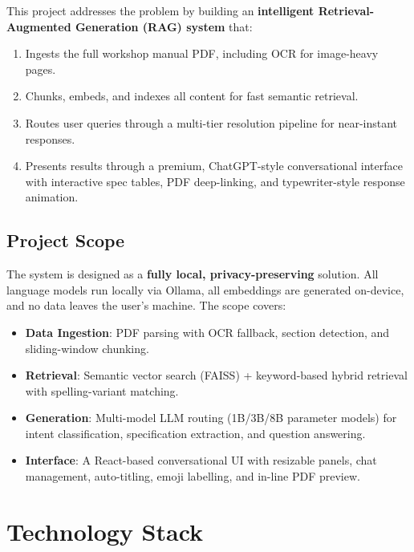 \documentclass[12pt, a4paper]{article}
\begin{document}
This project addresses the problem by building an \textbf{intelligent Retrieval-Augmented Generation (RAG) system} that:
\begin{enumerate}[itemsep=2pt]
  \item Ingests the full workshop manual PDF, including OCR for image-heavy pages.
  \item Chunks, embeds, and indexes all content for fast semantic retrieval.
  \item Routes user queries through a multi-tier resolution pipeline for near-instant responses.
  \item Presents results through a premium, ChatGPT-style conversational interface with interactive spec tables, PDF deep-linking, and typewriter-style response animation.
\end{enumerate}

\subsection{Project Scope}

The system is designed as a \textbf{fully local, privacy-preserving} solution. All language models run locally via Ollama, all embeddings are generated on-device, and no data leaves the user's machine. The scope covers:

\begin{itemize}[itemsep=2pt]
  \item \textbf{Data Ingestion}: PDF parsing with OCR fallback, section detection, and sliding-window chunking.
  \item \textbf{Retrieval}: Semantic vector search (FAISS) + keyword-based hybrid retrieval with spelling-variant matching.
  \item \textbf{Generation}: Multi-model LLM routing (1B/3B/8B parameter models) for intent classification, specification extraction, and question answering.
  \item \textbf{Interface}: A React-based conversational UI with resizable panels, chat management, auto-titling, emoji labelling, and in-line PDF preview.
\end{itemize}

\section{Technology Stack}
\end{document}
